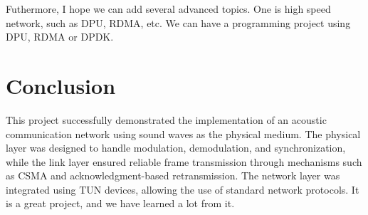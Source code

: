 \documentclass{article}
\begin{document}
Futhermore, I hope we can add several advanced topics.
One is high speed network, such as DPU, RDMA, etc.
We can have a programming project using DPU, RDMA or DPDK.

\section{Conclusion}

This project successfully demonstrated the implementation of an acoustic communication network using sound waves as the physical medium.
The physical layer was designed to handle modulation, demodulation, and synchronization, while the link layer ensured reliable frame transmission through mechanisms such as CSMA and acknowledgment-based retransmission. The network layer was integrated using TUN devices, allowing the use of standard network protocols.
It is a great project, and we have learned a lot from it.
\end{document}

